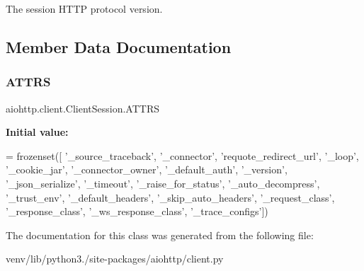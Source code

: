 \begin{DoxyVerb}The session HTTP protocol version.\end{DoxyVerb}
 

\subsection{Member Data Documentation}
\mbox{\label{classaiohttp_1_1client_1_1_client_session_a4dcedc55c62c7ba338498e7ee8f475ec}} 
\subsubsection{\texorpdfstring{A\+T\+T\+RS}{ATTRS}}
{\footnotesize\ttfamily aiohttp.\+client.\+Client\+Session.\+A\+T\+T\+RS\hspace{0.3cm}{\ttfamily [static]}}

{\bfseries Initial value\+:}
\begin{DoxyCode}
=  frozenset([
        \textcolor{stringliteral}{'\_source\_traceback'}, \textcolor{stringliteral}{'\_connector'},
        \textcolor{stringliteral}{'requote\_redirect\_url'}, \textcolor{stringliteral}{'\_loop'}, \textcolor{stringliteral}{'\_cookie\_jar'},
        \textcolor{stringliteral}{'\_connector\_owner'}, \textcolor{stringliteral}{'\_default\_auth'},
        \textcolor{stringliteral}{'\_version'}, \textcolor{stringliteral}{'\_json\_serialize'},
        \textcolor{stringliteral}{'\_timeout'}, \textcolor{stringliteral}{'\_raise\_for\_status'}, \textcolor{stringliteral}{'\_auto\_decompress'},
        \textcolor{stringliteral}{'\_trust\_env'}, \textcolor{stringliteral}{'\_default\_headers'}, \textcolor{stringliteral}{'\_skip\_auto\_headers'},
        \textcolor{stringliteral}{'\_request\_class'}, \textcolor{stringliteral}{'\_response\_class'},
        \textcolor{stringliteral}{'\_ws\_response\_class'}, \textcolor{stringliteral}{'\_trace\_configs'}])
\end{DoxyCode}


The documentation for this class was generated from the following file\+:\begin{DoxyCompactItemize}
\item 
venv/lib/python3./site-\/packages/aiohttp/client.\+py\end{DoxyCompactItemize}
